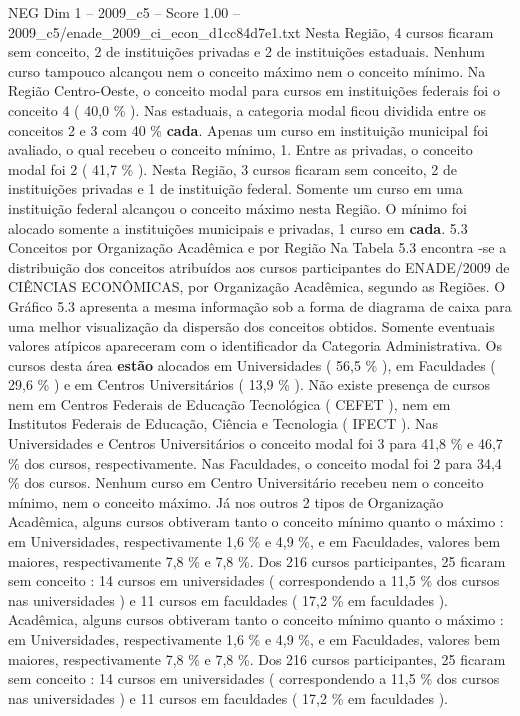 \begin{textsample}{NEG Dim 1 – 2009\_c5 – Score 1.00 – 2009\_c5/enade\_2009\_ci\_econ\_d1cc84d7e1.txt}
Nesta Região, 4 cursos ficaram sem conceito, 2 de instituições privadas e 2 de instituições estaduais.
Nenhum curso tampouco alcançou nem o conceito máximo nem o conceito mínimo.
Na Região Centro-Oeste, o conceito modal para cursos em instituições federais foi o conceito 4 ( 40,0 \% ).
Nas estaduais, a categoria modal ficou dividida entre os conceitos 2 e 3 com 40 \% \textbf{cada}.
Apenas um curso em instituição municipal foi avaliado, o qual recebeu o conceito mínimo, 1.
Entre as privadas, o conceito modal foi 2 ( 41,7 \% ).
Nesta Região, 3 cursos ficaram sem conceito, 2 de instituições privadas e 1 de instituição federal.
Somente um curso em uma instituição federal alcançou o conceito máximo nesta Região.
O mínimo foi alocado somente a instituições municipais e privadas, 1 curso em \textbf{cada}. 5.3 Conceitos por Organização Acadêmica e por Região Na Tabela 5.3 encontra -se a distribuição dos conceitos atribuídos aos cursos participantes do ENADE/2009 de CIÊNCIAS ECONÔMICAS, por Organização Acadêmica, segundo as Regiões.
O Gráfico 5.3 apresenta a mesma informação sob a forma de diagrama de caixa para uma melhor visualização da dispersão dos conceitos obtidos.
Somente eventuais valores atípicos apareceram com o identificador da Categoria Administrativa.
Os cursos desta área \textbf{estão} alocados em Universidades ( 56,5 \% ), em Faculdades ( 29,6 \% ) e em Centros Universitários ( 13,9 \% ).
Não existe presença de cursos nem em Centros Federais de Educação Tecnológica ( CEFET ), nem em Institutos Federais de Educação, Ciência e Tecnologia ( IFECT ).
Nas Universidades e Centros Universitários o conceito modal foi 3 para 41,8 \% e 46,7 \% dos cursos, respectivamente.
Nas Faculdades, o conceito modal foi 2 para 34,4 \% dos cursos.
Nenhum curso em Centro Universitário recebeu nem o conceito mínimo, nem o conceito máximo.
Já nos outros 2 tipos de Organização Acadêmica, alguns cursos obtiveram tanto o conceito mínimo quanto o máximo : em Universidades, respectivamente 1,6 \% e 4,9 \%, e em Faculdades, valores bem maiores, respectivamente 7,8 \% e 7,8 \%.
Dos 216 cursos participantes, 25 ficaram sem conceito : 14 cursos em universidades ( correspondendo a 11,5 \% dos cursos nas universidades ) e 11 cursos em faculdades ( 17,2 \% em faculdades ).
Acadêmica, alguns cursos obtiveram tanto o conceito mínimo quanto o máximo : em Universidades, respectivamente 1,6 \% e 4,9 \%, e em Faculdades, valores bem maiores, respectivamente 7,8 \% e 7,8 \%.
Dos 216 cursos participantes, 25 ficaram sem conceito : 14 cursos em universidades ( correspondendo a 11,5 \% dos cursos nas universidades ) e 11 cursos em faculdades ( 17,2 \% em faculdades ).

\end{textsample}

